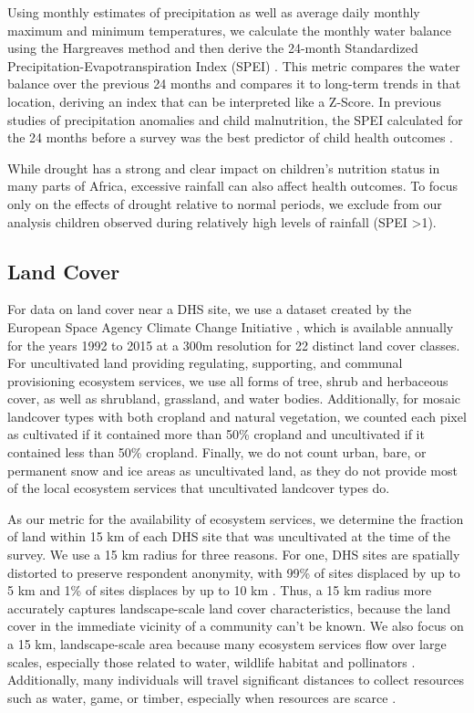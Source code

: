 \documentclass{article}
\begin{document}
Using monthly estimates of precipitation as well as average daily monthly maximum and minimum temperatures, we calculate the monthly water balance using the Hargreaves method \cite{Hargreaves1982} and then derive the 24-month Standardized Precipitation-Evapotranspiration Index (SPEI) \cite{Begueria2014}.  This metric compares the water balance over the previous 24 months and compares it to long-term trends in that location, deriving an index that can be interpreted like a Z-Score.  In previous studies of precipitation anomalies and child malnutrition, the SPEI calculated for the 24 months before a survey was the best predictor of child health outcomes \cite{Cooper2019Mapping}.

While drought has a strong and clear impact on children's nutrition status in many parts of Africa, excessive rainfall can also affect health outcomes.  To focus  only on the effects of drought relative to normal periods, we exclude from our analysis children observed during relatively high levels of rainfall (SPEI \textgreater 1).

\subsection{Land Cover}
For data on land cover near a DHS site, we use a dataset created by the European Space Agency Climate Change Initiative \cite{Defourny2017}, which is available annually for the years 1992 to 2015 at a 300m resolution for 22 distinct land cover classes.  For uncultivated land providing regulating, supporting, and communal provisioning ecosystem services, we use all forms of tree, shrub and herbaceous cover, as well as shrubland, grassland, and water bodies.  Additionally, for mosaic landcover types with both cropland and natural vegetation, we counted each pixel as cultivated if it contained more than 50\% cropland and uncultivated if it contained less than 50\% cropland.  Finally, we do not count urban, bare, or permanent snow and ice areas as uncultivated land, as they do not provide most of the local ecosystem services that uncultivated landcover types do.

As our metric for the availability of ecosystem services, we determine the fraction of land within 15 km of each DHS site that was uncultivated at the time of the survey.  We use a 15 km radius for three reasons.  For one, DHS sites are spatially distorted to preserve respondent anonymity, with 99\% of sites displaced by up to 5 km and 1\% of sites displaces by up to 10 km \cite{Grace2012}.  Thus, a 15 km radius more accurately captures landscape-scale land cover characteristics, because the land cover in the immediate vicinity of a community can't be known.  We also focus on a 15 km, landscape-scale area because many ecosystem services flow over large scales, especially those related to water, wildlife habitat and pollinators \cite{Lopez-Hoffman2010}.  Additionally, many individuals will travel significant distances to collect resources such as water, game, or timber, especially when resources are scarce \cite{Felardo2016, Arku2010}.
\end{document}
